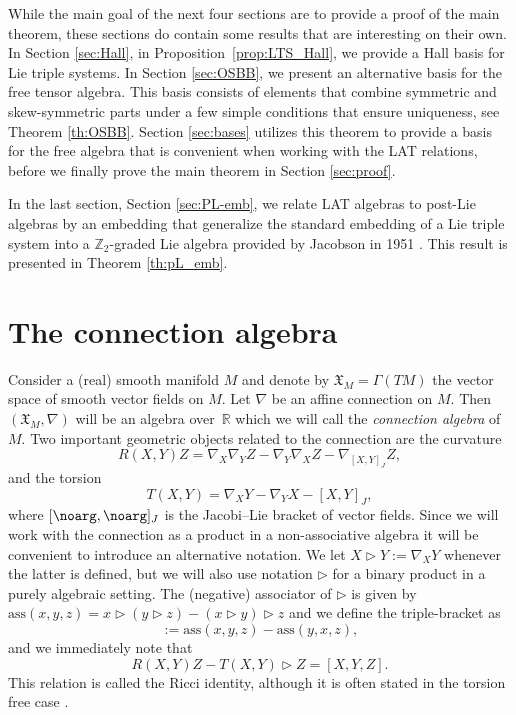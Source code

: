 \documentclass[pdftex]{sigma}
\numberwithin{equation}{section}
\begin{document}
While the main goal of the next four sections are to provide a proof of the main theorem, these sections do contain some results that are interesting on their own. In Section \ref{sec:Hall}, in Proposition~\ref{prop:LTS_Hall}, we provide a Hall basis for Lie triple systems. In Section \ref{sec:OSBB}, we present an alternative basis for the free tensor algebra. This basis consists of elements that combine symmetric and skew-symmetric parts under a few simple conditions that ensure uniqueness, see Theorem \ref{th:OSBB}. Section \ref{sec:bases} utilizes this theorem to provide a basis for the free algebra that is convenient when working with the LAT relations, before we finally prove the main theorem in Section \ref{sec:proof}.

In the last section, Section \ref{sec:PL-emb}, we relate LAT algebras to post-Lie algebras by an embedding that generalize the standard embedding of a Lie triple system into a $\mathbb{Z}_2$-graded Lie algebra provided by Jacobson in 1951 \cite{Jacobson1951}. This result is presented in Theorem \ref{th:pL_emb}.

\section{The connection algebra}\label{sec2}

Consider a (real) smooth manifold $M$ and denote by $\mathfrak{X}_M= \Gamma(TM)$ the vector space of smooth vector fields on $M$. Let $\nabla$ be an affine connection on $M$. Then $(\mathfrak{X}_M, \nabla)$ will be an algebra over~$\mathbb{R}$ which we will call the \textit{connection algebra} of $M$. Two important geometric objects related to the connection are the curvature
\begin{equation*}%
 R(X,Y)Z = \nabla_X \nabla_Y Z - \nabla_Y \nabla_X Z - \nabla_{[X,Y]_J} Z,
\end{equation*}
and the torsion
\begin{equation*}%
 T(X,Y) = \nabla_X Y - \nabla_Y X - [X,Y]_J,
\end{equation*}
where $[\noarg , \noarg ]_J$ is the Jacobi--Lie bracket of vector fields. Since we will work with the connection as a product in a non-associative algebra it will be convenient to introduce an alternative notation. We let $X \rhd Y := \nabla_X Y$ whenever the latter is defined, but we will also use notation $\rhd$ for a binary product in a purely algebraic setting. The (negative) associator of $\rhd$ is given by $\text{ass}(x,y,z)= x \rhd (y \rhd z) - (x \rhd y ) \rhd z$ and we define the triple-bracket as
\begin{equation*}%
 [x,y,z] := \text{ass}(x,y,z) - \text{ass}(y,x,z),
\end{equation*}
and we immediately note that
\begin{equation*}%
 R(X,Y)Z - T(X,Y) \rhd Z = [X,Y,Z].
\end{equation*}
This relation is called the Ricci identity, although it is often stated in the torsion free case \cite{Besse_1987, Ricci_1900}.
\end{document}
